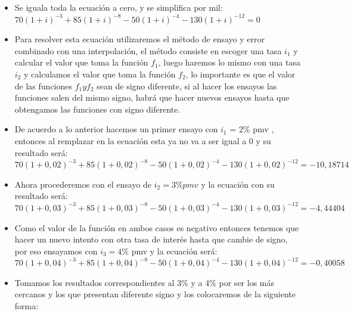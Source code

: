 \begin{itemize}
	\begin{itemize}
		\item Se iguala toda la ecuación a cero, y se simplifica por mil:\\
		
		$70(1 + i)^{-3} + 85(1 + i)^{-8} - 50(1 + i)^{-4} - 130(1 + i)^{-12} = 0$\\
		
		\item  Para resolver esta ecuación utilizaremos el método de ensayo y error combinado con una interpolación, el método consiste en escoger una tasa $i_{1}$ y calcular el valor que toma la función $f_{1}$, luego haremos lo mismo con una tasa $i_{2}$ y calculamos el valor que toma la función $f_{2}$, lo importante es que el valor de las funciones $f_{1} y f_{2}$ sean de signo diferente, si al hacer los ensayos las funciones salen del mismo signo, habrá que hacer nuevos ensayos hasta que obtengamos las funciones con signo diferente.\\
		
		\item 	De acuerdo a lo anterior hacemos un primer ensayo con $i_{1}$ = 2\% pmv , entonces al remplazar en la ecuación esta ya no va a ser igual a 0 y su resultado será:\\
		
		$70(1 + 0,02)^{-3} + 85(1 + 0,02)^{-8} - 50(1 + 0,02)^{-4} - 130(1 + 0,02)^{-12} = -10,18714$\\
		
		\item 	Ahora procederemos con el ensayo de $i_{2} =3\% pmv$ y la ecuación con su resultado será:\\
		
		$70(1 + 0,03)^{-3} + 85(1 + 0,03)^{-8} - 50(1 + 0,03)^{-4} - 130(1 + 0,03)^{-12} = -4,44404$\\
		
		\item Como el valor de la función en ambos casos es negativo entonces tenemos que hacer un nuevo intento con otra tasa de interés hasta que cambie de signo, por eso ensayamos con $i_{3} = 4\%$ pmv y la ecuación será:\\
		
		$70(1 + 0,04)^{-3} + 85(1 + 0,04)^{-8} - 50(1 + 0,04)^{-4} - 130(1 + 0,04)^{-12} = -0,40058$\\
		
		\item Tomamos los resultados correspondientes al 3\% y a 4\% por ser los más cercanos y los que presentan diferente signo y los colocaremos de la siguiente forma:\\
		

\end{itemize}
\end{itemize}
